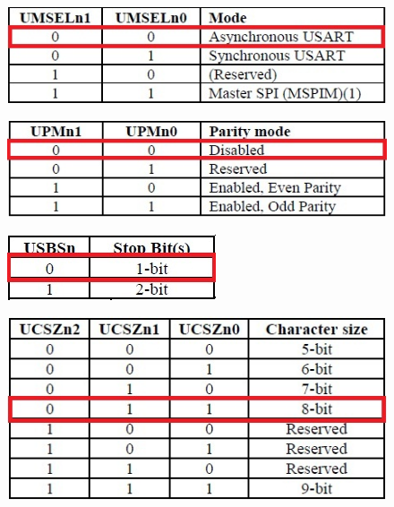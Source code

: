 \documentclass[table,10pt,red]{beamer}	%
\begin{document}
\begin{frame}[shrink]

\begin{figure}
\includegraphics[width=0.8\linewidth]{UMSE}
\end{figure}
\pause
\begin{figure}
\includegraphics[width=0.8\linewidth]{parity}
\end{figure}
\pause
\begin{figure}
\includegraphics[width=0.4\linewidth]{stop_bit}
\end{figure}
\pause
\begin{figure}
\includegraphics[width=0.8\linewidth]{bit}
\end{figure}
\end{frame}	
\end{document}
